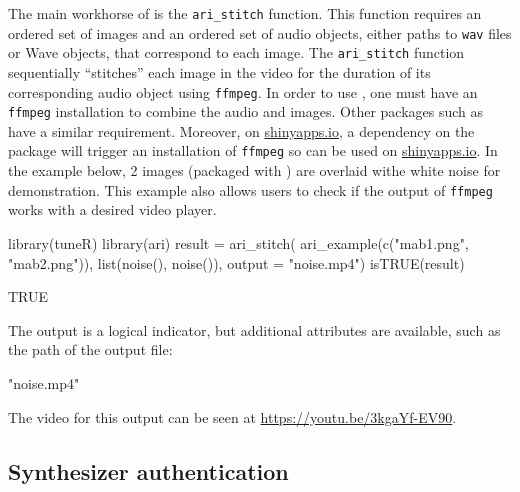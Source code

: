 The main workhorse of  is the \texttt{ari\_stitch} function.
This function requires an ordered set of images and an ordered set of
audio objects, either paths to \texttt{wav} files or  Wave
objects, that correspond to each image. The \texttt{ari\_stitch}
function sequentially ``stitches'' each image in the video for the
duration of its corresponding audio object using \texttt{ffmpeg}. In
order to use , one must have an \texttt{ffmpeg} installation to
combine the audio and images. Other packages such as 
have a similar requirement. Moreover, on
\href{https://www.shinyapps.io/}{shinyapps.io}, a dependency on the
 package will trigger an installation of \texttt{ffmpeg}
so  can be used on
\href{https://www.shinyapps.io/}{shinyapps.io}. In the example below, 2
images (packaged with ) are overlaid withe white noise for
demonstration. This example also allows users to check if the output of
\texttt{ffmpeg} works with a desired video player.

\begin{Schunk}
\begin{Sinput}
library(tuneR)
library(ari)
result = ari_stitch(
  ari_example(c("mab1.png", "mab2.png")),
  list(noise(), noise()),
  output = "noise.mp4")
isTRUE(result)
\end{Sinput}
\end{Schunk}

\begin{Schunk}
\begin{Soutput}
[1] TRUE
\end{Soutput}
\end{Schunk}

The output is a logical indicator, but additional attributes are
available, such as the path of the output file:

\begin{Schunk}
\end{Schunk}

\begin{Schunk}
\begin{Soutput}
[1] "noise.mp4"
\end{Soutput}
\end{Schunk}

The video for this output can be seen at
\url{https://youtu.be/3kgaYf-EV90}.

\hypertarget{synthesizer-authentication}{%
\subsection{Synthesizer
authentication}\label{synthesizer-authentication}}


